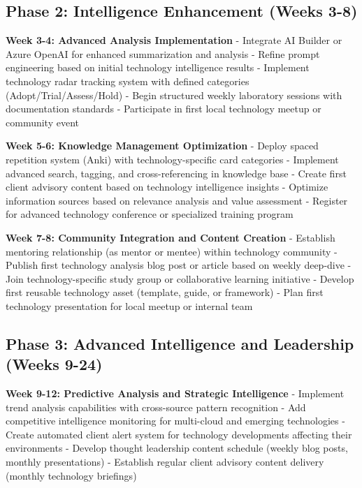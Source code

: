 \documentclass[
  letterpaper,
  DIV=11,
  numbers=noendperiod]{scrartcl}
\begin{document}
\subsection{Phase 2: Intelligence Enhancement (Weeks
3-8)}\label{phase-2-intelligence-enhancement-weeks-3-8}

\textbf{Week 3-4: Advanced Analysis Implementation} - Integrate AI
Builder or Azure OpenAI for enhanced summarization and analysis - Refine
prompt engineering based on initial technology intelligence results -
Implement technology radar tracking system with defined categories
(Adopt/Trial/Assess/Hold) - Begin structured weekly laboratory sessions
with documentation standards - Participate in first local technology
meetup or community event

\textbf{Week 5-6: Knowledge Management Optimization} - Deploy spaced
repetition system (Anki) with technology-specific card categories -
Implement advanced search, tagging, and cross-referencing in knowledge
base - Create first client advisory content based on technology
intelligence insights - Optimize information sources based on relevance
analysis and value assessment - Register for advanced technology
conference or specialized training program

\textbf{Week 7-8: Community Integration and Content Creation} -
Establish mentoring relationship (as mentor or mentee) within technology
community - Publish first technology analysis blog post or article based
on weekly deep-dive - Join technology-specific study group or
collaborative learning initiative - Develop first reusable technology
asset (template, guide, or framework) - Plan first technology
presentation for local meetup or internal team

\subsection{Phase 3: Advanced Intelligence and Leadership (Weeks
9-24)}\label{phase-3-advanced-intelligence-and-leadership-weeks-9-24}

\textbf{Week 9-12: Predictive Analysis and Strategic Intelligence} -
Implement trend analysis capabilities with cross-source pattern
recognition - Add competitive intelligence monitoring for multi-cloud
and emerging technologies - Create automated client alert system for
technology developments affecting their environments - Develop thought
leadership content schedule (weekly blog posts, monthly presentations) -
Establish regular client advisory content delivery (monthly technology
briefings)
\end{document}
